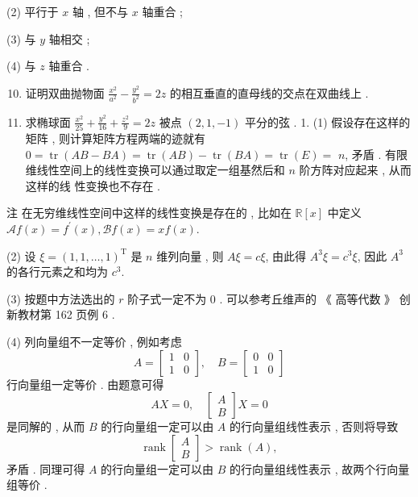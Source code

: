 \documentclass[10pt]{article}
\begin{document}
(2)  平行于  $x$  轴 ,  但不与  $x$  轴重合 ;

(3)  与  $y$  轴相交 ;

(4) 与  $z$  轴重合 .

\begin{enumerate}
  \setcounter{enumi}{9}
  \item  证明双曲抛物面  $\frac{x^{2}}{a^{2}}-\frac{y^{2}}{b^{2}}=2 z$  的相互垂直的直母线的交点在双曲线上 .

  \item  求椭球面  $\frac{x^{2}}{25}+\frac{y^{2}}{16}+\frac{z^{2}}{9}=2 z$  被点  $(2,1,-1)$  平分的弦 . 1. (1)  假设存在这样的矩阵 ,  则计算矩阵方程两端的迹就有  $0=\operatorname{tr}(A B-B A)=\operatorname{tr}(A B)-\operatorname{tr}(B A)=\operatorname{tr}(E)=$ $n$,  矛盾 .  有限维线性空间上的线性变换可以通过取定一组基然后和  $n$  阶方阵对应起来 ,  从而这样的线   性变换也不存在 .

\end{enumerate}
 注   在无穷维线性空间中这样的线性变换是存在的 ,  比如在  $\mathbb{R}[x]$  中定义  $\mathscr{A} f(x)=f^{\prime}(x), \mathscr{B} f(x)=x f(x)$.

(2)  设  $\xi=(1,1, \ldots, 1)^{\mathrm{T}}$  是  $n$  维列向量 ,  则  $A \xi=c \xi$,  由此得  $A^{3} \xi=c^{3} \xi$,  因此  $A^{3}$  的各行元素之和均为  $c^{3}$.

(3)  按题中方法选出的  $r$  阶子式一定不为  0 .  可以参考丘维声的 《 高等代数 》 创新教材第  162  页例  6 .

(4)  列向量组不一定等价 ,  例如考虑 
$$
A=\left[\begin{array}{ll}
1 & 0 \\
1 & 0
\end{array}\right], \quad B=\left[\begin{array}{ll}
0 & 0 \\
1 & 0
\end{array}\right]
$$
 行向量组一定等价 .  由题意可得 
$$
A X=0, \quad\left[\begin{array}{c}
A \\
B
\end{array}\right] X=0
$$
 是同解的 ,  从而  $B$  的行向量组一定可以由  $A$  的行向量组线性表示 ,  否则将导致 
$$
\operatorname{rank}\left[\begin{array}{c}
A \\
B
\end{array}\right]>\operatorname{rank}(A),
$$
 矛盾 .  同理可得  $A$  的行向量组一定可以由  $B$  的行向量组线性表示 ,  故两个行向量组等价 .
\end{document}
